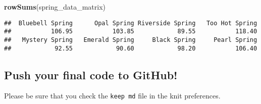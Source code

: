 \documentclass[
]{article}
\newenvironment{Shaded}{\begin{snugshade}}{\end{snugshade}}
\newcommand{\FunctionTok}[1]{\textcolor[rgb]{0.13,0.29,0.53}{\textbf{#1}}}
\newcommand{\NormalTok}[1]{#1}
\begin{document}
\begin{Shaded}
\begin{Highlighting}[]
\FunctionTok{rowSums}\NormalTok{(spring\_data\_matrix)}
\end{Highlighting}
\end{Shaded}

\begin{verbatim}
##  Bluebell Spring      Opal Spring Riverside Spring   Too Hot Spring 
##           106.95           103.85            89.55           118.40 
##   Mystery Spring   Emerald Spring     Black Spring     Pearl Spring 
##            92.55            90.60            98.20           106.40
\end{verbatim}

\hypertarget{push-your-final-code-to-github}{%
\subsection{Push your final code to
GitHub!}\label{push-your-final-code-to-github}}

Please be sure that you check the \texttt{keep\ md} file in the knit
preferences.
\end{document}
